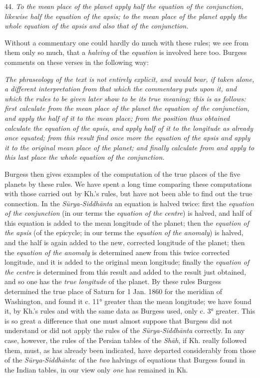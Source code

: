 \documentclass[11pt]{article}
\newcommand{\Pg}[1]{\marginpar{\footnotesize\color{gray}#1}}
\begin{document}
\par 44. \emph{To the mean place of the planet apply half the equation of the conjunction, likewise half the equation of the apsis; to the mean place of the planet apply the whole equation of the apsis and also that of the conjunction.}\par
\par Without a commentary one could hardly do much with these rules; we see from them only so much, that a \emph{halving} of the \emph{equation} is involved here too. Burgess comments on these verses in the following way:\par
\par \emph{The phraseology of the text is not entirely explicit, and would bear, if taken alone, a different interpretation from that which the commentary puts upon it, and which the rules to be given later show to be its true meaning; this is as follows: first calculate from the mean place of the planet the equation of the conjunction, and apply the half of it to the mean place; from the position thus obtained calculate the equation of the apsis, and apply half of it to the longitude as already once equated; from this result find once more the equation of the apsis and apply it to the original mean place of the planet; and finally calculate from and apply to this last place the whole equation of the conjunction.}\par
\par \Pg{52}Burgess then gives examples of the computation of the true places of the five planets by these rules. We have spent a long time comparing these computations with those carried out by Kh.'s rules, but have not been able to find out the true connection. In the \emph{Sūrya-Siddhānta} an equation is halved twice: first the \emph{equation of the conjunction} (in our terms the \emph{equation of the centre}) is halved, and half of this equation is added to the mean longitude of the planet; then the \emph{equation of the apsis} (of the epicycle; in our terms the \emph{equation of the anomaly}) is halved, and the half is again added to the new, corrected longitude of the planet; then the \emph{equation of the anomaly} is determined anew from this twice corrected longitude, and it is added to the original mean longitude; finally the \emph{equation of the centre} is determined from this result and added to the result just obtained, and so one has the \emph{true longitude} of the planet. By these rules Burgess determined the true place of Saturn for 1 Jan. 1860 for the meridian of Washington, and found it c. 11° greater than the mean longitude; we have found it, by Kh.'s rules and with the same data as Burgess used, only c. 3° greater. This is so great a difference that one must almost suppose that Burgess did not understand or did not apply the rules of the \emph{Sūrya-Siddhānta} correctly. In any case, however, the rules of the Persian tables of the \emph{Shāh}, if Kh. really followed them, must, as has already been indicated, have departed considerably from those of the \emph{Sūrya-Siddhānta}: of the \emph{two} halvings of equations that Burgess found in the Indian tables, in our view only \emph{one} has remained in Kh.\par
\end{document}
